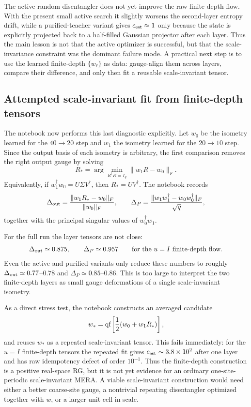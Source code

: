 \documentclass[aps,prb,twocolumn,floatfix]{revtex4-2}
\begin{document}
The active random disentangler does not yet improve the raw finite-depth flow.
With the present small active search it slightly worsens the second-layer
entropy drift, while a purified-teacher variant gives \(c_{\rm est}\approx1\)
only because the state is explicitly projected back to a half-filled Gaussian
projector after each layer.  Thus the main lesson is not that the active
optimizer is successful, but that the scale-invariance constraint was the
dominant failure mode.  A practical next step is to use the learned finite-depth
\(\{w_\ell\}\) as data: gauge-align them across layers, compare their
difference, and only then fit a reusable scale-invariant tensor.

\subsection{Attempted scale-invariant fit from finite-depth tensors}

The notebook now performs this last diagnostic explicitly.  Let \(w_0\) be the
isometry learned for the \(40\to20\) step and \(w_1\) the isometry learned for
the \(20\to10\) step.  Since the output basis of each isometry is arbitrary,
the first comparison removes the right output gauge by solving
\begin{equation}
  R_*=\arg\min_{R^\dagger R=I_q}\|w_1R-w_0\|_F .
\end{equation}
Equivalently, if \(w_1^\dagger w_0=U\Sigma V^\dagger\), then
\(R_*=UV^\dagger\).  The notebook records
\begin{equation}
  \Delta_{\rm out}
  =
  \frac{\|w_1R_*-w_0\|_F}{\|w_0\|_F},
  \qquad
  \Delta_P
  =
  \frac{\|w_1w_1^\dagger-w_0w_0^\dagger\|_F}{\sqrt q},
\end{equation}
together with the principal singular values of \(w_0^\dagger w_1\).

For the full run the layer tensors are not close:
\begin{equation}
  \Delta_{\rm out}\simeq0.875,\qquad
  \Delta_P\simeq0.957
  \qquad
  \text{for the } u=I \text{ finite-depth flow}.
\end{equation}
Even the active and purified variants only reduce these numbers to roughly
\(\Delta_{\rm out}\simeq0.77\)--\(0.78\) and
\(\Delta_P\simeq0.85\)--\(0.86\).  This is too large to interpret the two
finite-depth layers as small gauge deformations of a single scale-invariant
isometry.

As a direct stress test, the notebook constructs an averaged candidate
\begin{equation}
  w_* = {\rm qf}\!\left[\frac{1}{2}(w_0+w_1R_*)\right],
\end{equation}
and reuses \(w_*\) as a repeated scale-invariant tensor.  This fails
immediately: for the \(u=I\) finite-depth tensors the repeated fit gives
\(c_{\rm est}\sim 3.8\times10^2\) after one layer and has raw idempotency
defect of order \(10^{-1}\).  Thus the finite-depth construction is a positive
real-space RG, but it is not yet evidence for an ordinary one-site-periodic
scale-invariant MERA.  A viable scale-invariant construction would need either
a better coarse-site gauge, a nontrivial repeating disentangler optimized
together with \(w\), or a larger unit cell in scale.
\end{document}
